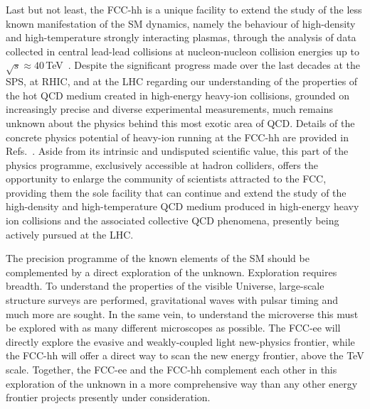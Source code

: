 Last but not least, the FCC-hh is a unique facility to extend the study of the less known manifestation of the SM dynamics, namely the behaviour of high-density and high-temperature strongly interacting plasmas, 
through the analysis of data collected in central lead-lead collisions at nucleon-nucleon collision energies up to $\sqrt{s} \approx 40$\,TeV~\cite{Dainese:2016gch}. 
Despite the significant progress made over the last decades at the SPS, at RHIC, and at the LHC regarding our understanding of the properties of the hot QCD medium created in high-energy heavy-ion collisions, grounded on increasingly precise and diverse experimental measurements, much remains unknown about the physics behind this most exotic area of QCD.
Details of the concrete physics potential of heavy-ion running at the FCC-hh are provided in Refs.~\cite{Dainese:2016gch,Mangano:2017tke}. 
Aside from its intrinsic and undisputed scientific value, this part of the physics programme, exclusively accessible at hadron colliders, offers the opportunity to enlarge the community of scientists attracted to the FCC, providing them the sole facility that can continue and extend the study of the high-density and high-temperature QCD medium produced in high-energy heavy ion collisions and the associated collective QCD phenomena, presently being actively pursued at the LHC.

The precision programme of the known elements of the SM should be complemented by a direct exploration of the unknown. Exploration requires breadth. 
To understand the properties of the visible Universe, large-scale structure surveys are performed, gravitational waves with pulsar timing and much more are sought. 
In the same vein, to understand the microverse this must be explored with as many different microscopes as possible. 
The FCC-ee will directly explore the evasive and weakly-coupled light new-physics frontier, 
while the FCC-hh will offer a direct way to scan the new energy frontier, above the TeV scale. 
Together, the FCC-ee and the FCC-hh complement each other in this exploration of the unknown in a more comprehensive way than any other energy frontier projects presently under consideration.